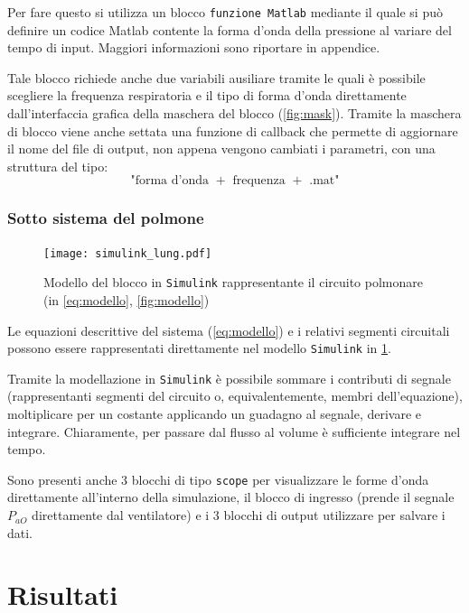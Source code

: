 Per fare questo si utilizza un blocco \texttt{funzione Matlab} mediante il quale si può definire un codice Matlab contente la forma d'onda della pressione al variare del tempo di input. Maggiori informazioni sono riportare in appendice. 

Tale blocco richiede anche due variabili ausiliare tramite le quali è possibile scegliere la frequenza respiratoria e il tipo di forma d'onda direttamente dall'interfaccia grafica della maschera del blocco (\cref{fig:mask}). Tramite la maschera di blocco viene anche settata una funzione di callback che permette di aggiornare il nome del file di output, non appena vengono cambiati i parametri, con una struttura del tipo:
\begin{equation*}
	\text{"forma d'onda } + \text{ frequenza } + \text{ .mat"}
\end{equation*}


\subsubsection{Sotto sistema del polmone}


\begin{figure}[t!]
	\centering
	\texttt{[image: simulink\_lung.pdf]}
	\caption{Modello del blocco in  \texttt{Simulink} rappresentante il circuito polmonare (in \cref{eq:modello}, \cref{fig:modello})}
	\label{fig:simulinkLung}
\end{figure}

Le equazioni descrittive del sistema (\cref{eq:modello}) e i relativi segmenti circuitali possono essere rappresentati direttamente nel modello  \texttt{Simulink} in \cref{fig:simulinkLung}. 

Tramite la modellazione in  \texttt{Simulink} è possibile sommare i contributi di segnale (rappresentanti segmenti del circuito o, equivalentemente, membri dell'equazione), moltiplicare per un costante applicando un guadagno al segnale, derivare e integrare. 
Chiaramente, per passare dal flusso al volume è sufficiente integrare nel tempo. 

Sono presenti anche 3 blocchi di tipo \texttt{scope} per visualizzare le forme d'onda direttamente all'interno della simulazione, il blocco di ingresso (prende il segnale $P_{aO}$ direttamente dal ventilatore) e i 3 blocchi di output utilizzare per salvare i dati. 


\section{Risultati}


